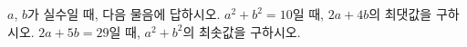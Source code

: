$a$, $b$가 실수일 때, 다음 물음에 답하시오.
 $a^2+b^2=10$일 때, $2a+4b$의 최댓값을 구하시오.
 $2a+5b=29$일 때, $a^2+b^2$의 최솟값을 구하시오.

